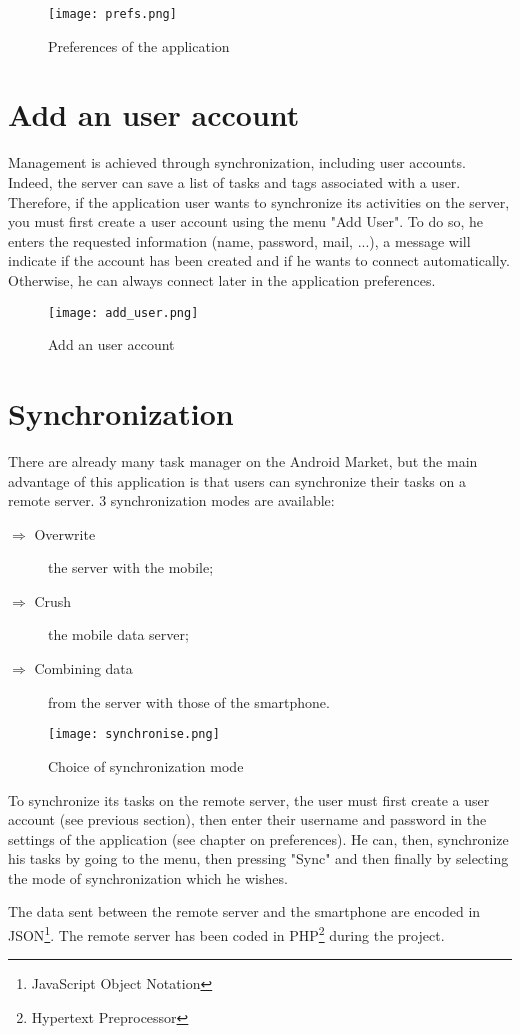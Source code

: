 \begin{figure}[!ht]
    \centering
    \texttt{[image: prefs.png]}
    \caption{Preferences of the application}
\end{figure}

\section{Add an user account}

Management is achieved through synchronization, including user accounts. Indeed, the server can save a list of tasks and tags associated with a user. Therefore, if the application user wants to synchronize its activities on the server, you must first create a user account using the menu "Add User".
To do so, he enters the requested information (name, password, mail, ...), a message will indicate if the account has been created and if he wants to connect automatically. Otherwise, he can always connect later in the application preferences.

\begin{figure}[!ht]
    \centering
    \texttt{[image: add\_user.png]}
    \caption{Add an user account}
\end{figure}

\section{Synchronization}

There are already many task manager on the Android Market, but the main advantage of this application is that users can synchronize their tasks on a remote server.
3 synchronization modes are available:
\begin{description}
    \item[$\Rightarrow$ Overwrite] the server with the mobile;
    \item[$\Rightarrow$ Crush] the mobile data server;
    \item[$\Rightarrow$ Combining data] from the server with those of the smartphone.
\end{description}

\begin{figure}[!ht]
    \centering
    \texttt{[image: synchronise.png]}
    \caption{Choice of synchronization mode}
\end{figure}

\noindent To synchronize its tasks on the remote server, the user must first create a user account (see previous section), then enter their username and password in the settings of the application (see chapter on preferences). He can, then, synchronize his tasks by going to the menu, then pressing "Sync" and then finally by selecting the mode of synchronization which he wishes.

\noindent The data sent between the remote server and the smartphone are encoded in JSON\protect\footnote{JavaScript Object Notation}. The remote server has been coded in PHP\protect\footnote{Hypertext Preprocessor} during the project.

\clearpage
